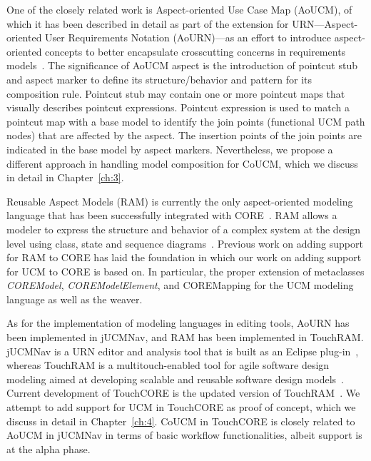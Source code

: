 One of the closely related work is Aspect-oriented Use Case Map (AoUCM), of which it has been described in detail as part of the extension for URN---Aspect-oriented User Requirements Notation (AoURN)---as an effort to introduce aspect-oriented concepts to better encapsulate crosscutting concerns in requirements models~\cite{mussbacher2011aspect}. The significance of AoUCM aspect is the introduction of pointcut stub and aspect marker to define its structure/behavior and pattern for its composition rule. Pointcut stub may contain one or more pointcut maps that visually describes pointcut expressions. Pointcut expression is used to match a pointcut map with a base model to identify the join points (functional UCM path nodes) that are affected by the aspect. The insertion points of the join points are indicated in the base model by aspect markers. Nevertheless, we propose a different approach in handling model composition for CoUCM, which we discuss in detail in Chapter~\ref{ch:3}.

Reusable Aspect Models (RAM) is currently the only aspect-oriented modeling language that has been successfully integrated with CORE~\cite{klein2007reusable}. RAM allows a modeler to express the structure and behavior of a complex system at the design level using class, state and sequence diagrams~\cite{kienzle2010aspect}. Previous work on adding support for RAM to CORE has laid the foundation in which our work on adding support for UCM to CORE is based on. In particular, the proper extension of metaclasses \textit{\cls COREModel}, \textit{\cls COREModelElement}, and {\cls COREMapping} for the UCM modeling language as well as the weaver.

As for the implementation of modeling languages in editing tools, AoURN has been implemented in jUCMNav, and RAM has been implemented in TouchRAM. jUCMNav is a URN editor and analysis tool that is built as an Eclipse plug-in~\cite{kealey2007enhanced}, whereas TouchRAM is a multitouch-enabled tool for agile software design modeling aimed at developing scalable and reusable software design models~\cite{al2012touchram, schottle2014touchram}. Current development of TouchCORE is the updated version of TouchRAM~\cite{sel2018touchcore}. We attempt to add support for UCM in TouchCORE as proof of concept, which we discuss in detail in Chapter~\ref{ch:4}. CoUCM in TouchCORE is closely related to AoUCM in jUCMNav in terms of basic workflow functionalities, albeit support is at the alpha phase.

